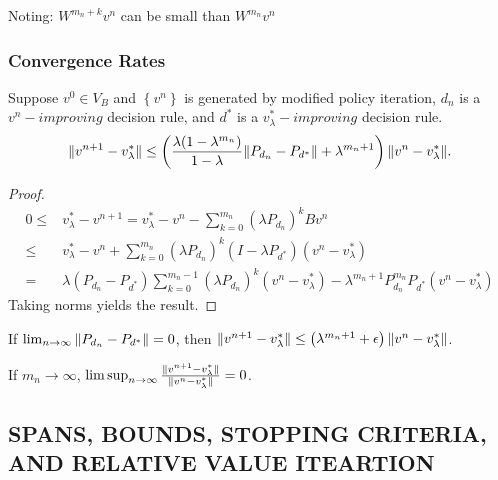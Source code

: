 Noting: $ W^{m_n + k} v^n $ can be small than $ W^{m_n} v^n $

\subsubsection{Convergence Rates}%
\label{ssub:convergence_rates}

\begin{theorem}
    Suppose $ v^0 \in V_B $ and $ \left\{ v^n \right\} $ is generated by modified policy iteration, $ d_n $ is a $ v^n-improving $ decision rule, and $ d^* $ is a $ v^*_\lambda-improving $ decision rule.
    \begin{equation}
        \Arrowvert v^{n+1} - v^*_\lambda \Arrowvert \le
        \left( \frac{\lambda (1 - \lambda^{m_n})}{1- \lambda} \Arrowvert P_{d_n} - P_{d^*} \Arrowvert + \lambda^{m_n + 1} \right) \Arrowvert v^n - v^*_{\lambda} \Arrowvert.
    \end{equation}
    \begin{proof}
        \begin{align*}
            0 \le& v^*_{\lambda} - v^{n+1} = v^*_{\lambda} - v^n - \sum^{m_n}_{k=0} {(\lambda P_{d_n})}^k B v^n \\
            \le& v^*_{\lambda} - v^n + \sum^{m_n}_{k=0} {(\lambda P_{d_n})}^k (I - \lambda P_{d^*}) (v^n - v^*_{\lambda})\\
            =& \lambda (P_{d_n} - P_{d^*}) \sum^{m_n - 1}_{k = 0} {(\lambda P_{d_n})}^k (v^n - v^*_{\lambda}) - \lambda^{m_n + 1} P^{m_n}_{d_n} P_{d^*} (v^n - v^*_{\lambda})
        \end{align*}
        Taking norms yields the result.
    \end{proof}
\end{theorem}

If $ \lim_{n \rightarrow \infty} \Arrowvert P_{d_n} - P_{d^*} \Arrowvert = 0 $, then $ \Arrowvert v^{n+1} - v^*_\lambda \Arrowvert \le \left( \lambda^{m_n + 1} + \epsilon \right) \Arrowvert v^n - v^*_\lambda \Arrowvert$.

If $ m_n \rightarrow \infty $, $ \lim\sup_{n \rightarrow \infty} \frac{ \Arrowvert v^{n+1} - v^*_{\lambda} \Arrowvert}{ \Arrowvert v^n - v^*_{\lambda} \Arrowvert} = 0 $.

\subsection{SPANS, BOUNDS, STOPPING CRITERIA, AND RELATIVE VALUE ITEARTION}%
\label{sub:spans_bounds_stopping_criteria_and_relative_value_iteartion}

